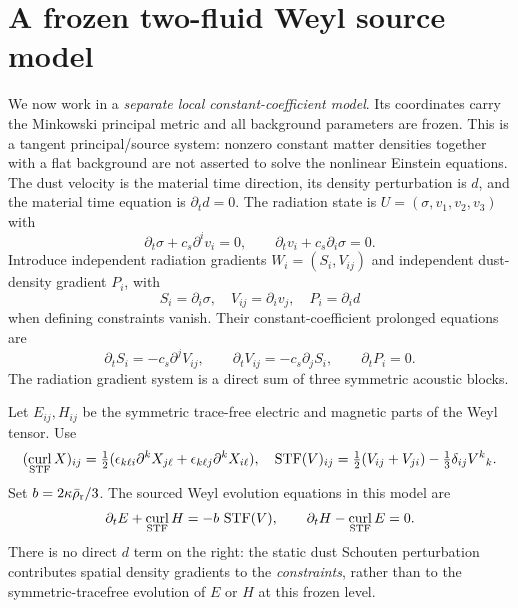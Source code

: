 \documentclass[10pt,a4paper]{article}
\DeclareMathOperator{\curl}{curl}
\DeclareMathOperator{\STF}{STF}
\newcommand{\kgr}{\kappa}
\begin{document}
\section{A frozen two-fluid Weyl source model}\label{sec:frozen}
We now work in a \emph{separate local constant-coefficient model}. Its coordinates carry the Minkowski principal metric and all background parameters are frozen. This is a tangent principal/source system: nonzero constant matter densities together with a flat background are not asserted to solve the nonlinear Einstein equations. The dust velocity is the material time direction, its density perturbation is $d$, and the material time equation is $\partial_t d=0$. The radiation state is $U=(\sigma,v_1,v_2,v_3)$ with
\begin{equation}\label{eq:acoustic}
\partial_t\sigma+c_s\partial^i v_i=0,\qquad
\partial_t v_i+c_s\partial_i\sigma=0.
\end{equation}
Introduce independent radiation gradients $W_i=(S_i,V_{ij})$ and independent dust-density gradient $P_i$, with
\begin{equation}\label{eq:jets}
S_i=\partial_i\sigma,\quad V_{ij}=\partial_i v_j,
\quad P_i=\partial_i d
\end{equation}
when defining constraints vanish. Their constant-coefficient prolonged equations are
\begin{equation}\label{eq:radjet}
\partial_t S_i=-c_s\partial^jV_{ij},\qquad
\partial_tV_{ij}=-c_s\partial_jS_i,\qquad
\partial_tP_i=0.
\end{equation}
The radiation gradient system is a direct sum of three symmetric acoustic blocks.

Let $E_{ij},H_{ij}$ be the symmetric trace-free electric and magnetic parts of the Weyl tensor. Use
\[
(\curl_{\rm STF}X)_{ij}=
\tfrac12(\epsilon_{k\ell i}\partial^kX_{j\ell}
+\epsilon_{k\ell j}\partial^kX_{i\ell}),
\quad \STF(V)_{ij}=\tfrac12(V_{ij}+V_{ji})-\tfrac13\delta_{ij}V^k{}_k.
\]
Set $b=2\kgr\bar\rho_{\rm r}/3$. The sourced Weyl evolution equations in this model are
\begin{equation}\label{eq:weyl}
\partial_tE+\curl_{\rm STF}H=-b\,\STF(V),
\qquad \partial_tH-\curl_{\rm STF}E=0.
\end{equation}
There is no direct $d$ term on the right: the static dust Schouten perturbation contributes spatial density gradients to the \emph{constraints}, rather than to the symmetric-tracefree evolution of $E$ or $H$ at this frozen level.
\end{document}
